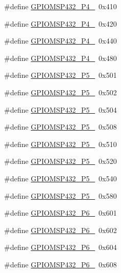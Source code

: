 \begin{DoxyCompactItemize}
\item 
\#define \hyperlink{_g_p_i_o_m_s_p432_8h_a189087d700a7250259eaacb641186bce}{G\+P\+I\+O\+M\+S\+P432\+\_\+\+P4\+\_}~0x410
\item 
\#define \hyperlink{_g_p_i_o_m_s_p432_8h_a46bac962e185ca62db54ba86951b9ce9}{G\+P\+I\+O\+M\+S\+P432\+\_\+\+P4\+\_}~0x420
\item 
\#define \hyperlink{_g_p_i_o_m_s_p432_8h_a7658b8732378d4085dd10ccec04bc4b0}{G\+P\+I\+O\+M\+S\+P432\+\_\+\+P4\+\_}~0x440
\item 
\#define \hyperlink{_g_p_i_o_m_s_p432_8h_a1939f549e35764d3b56de788f2a19042}{G\+P\+I\+O\+M\+S\+P432\+\_\+\+P4\+\_}~0x480
\item 
\#define \hyperlink{_g_p_i_o_m_s_p432_8h_a1374c7e0a2ee5f3d2aa2da7d63b37925}{G\+P\+I\+O\+M\+S\+P432\+\_\+\+P5\+\_}~0x501
\item 
\#define \hyperlink{_g_p_i_o_m_s_p432_8h_abb7cf0df024ca760ea1f5210f9698e06}{G\+P\+I\+O\+M\+S\+P432\+\_\+\+P5\+\_}~0x502
\item 
\#define \hyperlink{_g_p_i_o_m_s_p432_8h_a2f6d8c2590f2cc37595c50b0142eb93f}{G\+P\+I\+O\+M\+S\+P432\+\_\+\+P5\+\_}~0x504
\item 
\#define \hyperlink{_g_p_i_o_m_s_p432_8h_af5011eba15f1ed0206e9ba7f5e356666}{G\+P\+I\+O\+M\+S\+P432\+\_\+\+P5\+\_}~0x508
\item 
\#define \hyperlink{_g_p_i_o_m_s_p432_8h_a3fd38bf10d5222b5624e25ad7b008a9b}{G\+P\+I\+O\+M\+S\+P432\+\_\+\+P5\+\_}~0x510
\item 
\#define \hyperlink{_g_p_i_o_m_s_p432_8h_a669727cbbe7030cd2d0a8a829952cbc9}{G\+P\+I\+O\+M\+S\+P432\+\_\+\+P5\+\_}~0x520
\item 
\#define \hyperlink{_g_p_i_o_m_s_p432_8h_a6e4c56a6e7c7ba77d25d95481ae64b8c}{G\+P\+I\+O\+M\+S\+P432\+\_\+\+P5\+\_}~0x540
\item 
\#define \hyperlink{_g_p_i_o_m_s_p432_8h_ade970b2ddb1f2c2949c95b602468d753}{G\+P\+I\+O\+M\+S\+P432\+\_\+\+P5\+\_}~0x580
\item 
\#define \hyperlink{_g_p_i_o_m_s_p432_8h_aeabd78a29e56b51d5e0e59e89a5b8855}{G\+P\+I\+O\+M\+S\+P432\+\_\+\+P6\+\_}~0x601
\item 
\#define \hyperlink{_g_p_i_o_m_s_p432_8h_aae0dc8495de31ab98fe07ed84848ebd9}{G\+P\+I\+O\+M\+S\+P432\+\_\+\+P6\+\_}~0x602
\item 
\#define \hyperlink{_g_p_i_o_m_s_p432_8h_ae101bbacfb81c270123bfe5cd80fd3f5}{G\+P\+I\+O\+M\+S\+P432\+\_\+\+P6\+\_}~0x604
\item 
\#define \hyperlink{_g_p_i_o_m_s_p432_8h_a7bcd0ec1471676ee9acb8448537ba69f}{G\+P\+I\+O\+M\+S\+P432\+\_\+\+P6\+\_}~0x608

\end{DoxyCompactItemize}
